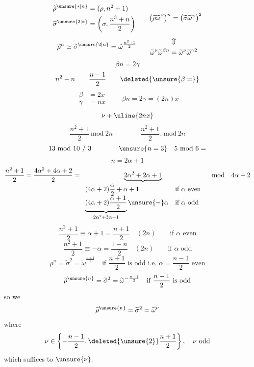 
\[
\begin{aligned}
\widetilde\rho^{\unsure{*|n}}&=(\rho,n^2+1)\\
\widetilde\sigma^{\unsure{2|*}}&=\left(\sigma,\frac{n^3+n}{2}\right)
\end{aligned}
\qquad
\bigl(\widetilde\rho\widetilde\omega^{\beta}\bigr)^n
=\bigl(\widetilde\sigma\widetilde\omega^{\gamma}\bigr)^2
\]
\[
\widetilde\rho^n\simeq\widetilde\sigma^{\unsure{2|n}}
=\widetilde\omega^{\frac{n^2+1}{2}}
\qquad
\begin{gathered}
\Updownarrow\\
\widetilde\omega^\nu\widetilde\omega^{\beta n}
=\widetilde\omega^\nu\widetilde\omega^{\gamma2}
\end{gathered}
\]
\[
\beta n=2\gamma
\]
\[
n^2-n\qquad\frac{n-1}{2}\qquad\deleted{\unsure{\beta=}}
\]
\[
\begin{aligned}
\beta&=2x\\
\gamma&=nx
\end{aligned}
\qquad
\beta n=2\gamma=(2n)x
\]
\[
\nu+\uline{2nx}
\]
\[
\frac{n^2+1}{2}\ \mathrm{mod}\ 2n
\qquad\qquad
\frac{n^2+1}{2}.\ \mathrm{mod}\ 2n
\]
\[
13\ \mathrm{mod}\ 10\ /\ 3
\qquad\qquad
\unsure{n=3}\quad5\ \mathrm{mod}\ 6=
\]
\[
n=2\alpha+1
\]
\[
\frac{n^2+1}{2}
=\frac{4\alpha^2+4\alpha+2}{2}
=\underbrace{2\alpha^2+2\alpha+1}_{
\begin{array}{ll}
(4\alpha+2)\dfrac{\alpha}{2}+\alpha+1&\text{if }\alpha\text{ even}\\
\underbrace{(4\alpha+2)\dfrac{\alpha+1}{2}}_{2\alpha^2+3\alpha+1}
\unsure{-}\alpha&\text{if }\alpha\text{ odd}
\end{array}}
\quad\mathrm{mod}\quad4\alpha+2
\]
\[
\frac{n^2+1}{2}\equiv\alpha+1=\frac{n+1}{2}
\quad(2n)\qquad\text{if }\alpha\text{ even}
\]
\[
\frac{n^2+1}{2}\equiv-\alpha=\frac{1-n}{2}
\quad(2n)\qquad\text{if }\alpha\text{ odd}
\]
\[
\rho^n=\widetilde\sigma^2=\widetilde\omega^{\frac{n+1}{2}}
\quad\text{if }\frac{n+1}{2}\text{ is odd i.e. }\alpha=\frac{n-1}{2}\text{ even}
\]
\[
\widetilde\rho^{\unsure{n}}=\widetilde\sigma^2
=\widetilde\omega^{-\frac{n-1}{2}}
\quad\text{if }\frac{n-1}{2}\text{ is odd}
\]
so we  
\[
\widetilde\rho^{\unsure{n}}=\widetilde\sigma^2=\widetilde\omega^\nu
\]
where
\[
\nu\in\left\{-\frac{n-1}{2},\deleted{\unsure{2}}\frac{n+1}{2}\right\},
\quad\nu\text{ odd}
\]
which suffices to  $\unsure{\nu}$.

